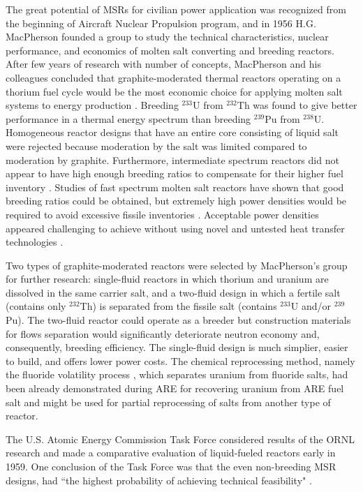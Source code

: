 The great potential of \glspl{MSR} for civilian power application was recognized from the beginning of Aircraft Nuclear Propulsion program, and in 1956 H.G. MacPherson founded a group to study the technical characteristics, nuclear performance, and economics of molten salt converting and breeding reactors. After few years of research with number of concepts, MacPherson and his colleagues concluded that graphite-moderated thermal reactors operating on a thorium fuel cycle would be the most economic choice for applying molten salt systems to energy production \cite{rosenthal_molten-salt_1970}. Breeding $^{233}$U from $^{232}$Th was found to give better performance in a thermal energy spectrum than breeding $^{239}$Pu from $^{238}$U. Homogeneous reactor designs that have an entire core consisting of liquid salt were rejected because moderation by the salt was limited compared to moderation by graphite. Furthermore, intermediate spectrum reactors did not appear to have high enough breeding ratios to compensate for their higher fuel inventory \cite{rosenthal_molten-salt_1970}. Studies of fast spectrum molten salt reactors have shown that good breeding ratios could be obtained, but extremely high power densities would be required to avoid excessive fissile inventories \cite{kasten_mosel_1964}. Acceptable  power densities appeared challenging to achieve without using novel and untested heat transfer technologies \cite{rosenthal_molten-salt_1970}.

Two types of graphite-moderated reactors were selected by MacPherson's group for further research: single-fluid reactors in which thorium and uranium are dissolved in the same carrier salt, and a two-fluid design in which a fertile salt (contains only $^{232}$Th) is separated from the fissile salt (contains $^{233}$U and/or $^{239}$Pu). The two-fluid reactor could operate as a breeder but construction materials for flows separation would significantly deteriorate neutron economy and, consequently, breeding efficiency. The single-fluid design is much simplier, easier to build, and offers lower power costs. The chemical reprocessing method, namely the fluoride volatility process \cite{cathers_uranium_1957}, which separates uranium from fluoride salts, had been already demonstrated during \gls{ARE} for recovering uranium from \gls{ARE} fuel salt and might be used for partial reprocessing of salts from another type of reactor.

The U.S. Atomic Energy Commission Task Force considered results of the \gls{ORNL} research and made a comparative evaluation of liquid-fueled reactors early in 1959. One conclusion of the Task Force was that the even non-breeding \gls{MSR} designs, had ``the highest probability of achieving technical feasibility" \cite{noauthor_report_1959}.

